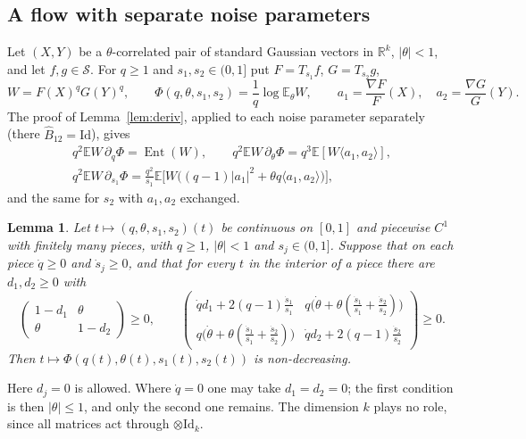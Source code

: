 \documentclass[11pt]{amsart}
\newtheorem{lemma}[theorem]{Lemma}
\theoremstyle{definition}
\newcommand{\E}{\mathbb{E}}
\newcommand{\R}{\mathbb{R}}
\newcommand{\Ent}{\operatorname{Ent}}
\newcommand{\cS}{\mathcal{S}}
\newcommand{\Id}{\mathrm{Id}}
\begin{document}
\subsection{A flow with separate noise parameters}\label{sec:noiseflow}
Let $(X,Y)$ be a $\theta$-correlated pair of standard Gaussian vectors in $\R^k$, $|\theta|<1$, and let $f,g\in\cS$. For
$q\ge1$ and $s_1,s_2\in(0,1]$ put $F=T_{s_1}f$, $G=T_{s_2}g$,
\[
W=F(X)^qG(Y)^q,\qquad\Phi(q,\theta,s_1,s_2)=\frac1q\log\E_\theta W,\qquad a_1=\frac{\nabla F}{F}(X),\quad
a_2=\frac{\nabla G}{G}(Y).
\]
The proof of Lemma~\ref{lem:deriv}, applied to each noise parameter separately (there $\widehat B_{12}=\Id$), gives
\begin{gather*}
q^2\E W\,\partial_q\Phi=\Ent(W),\qquad q^2\E W\,\partial_\theta\Phi=q^3\E[W\langle a_1,a_2\rangle],\\
q^2\E W\,\partial_{s_1}\Phi=\frac{q^2}{s_1}\E\big[W\big((q-1)|a_1|^2+\theta q\langle a_1,a_2\rangle\big)\big],
\end{gather*}
and the same for $s_2$ with $a_1,a_2$ exchanged.

\begin{lemma}\label{lem:noise}
Let $t\mapsto(q,\theta,s_1,s_2)(t)$ be continuous on $[0,1]$ and piecewise $C^1$ with finitely many pieces, with $q\ge1$, $|\theta|<1$ and
$s_j\in(0,1]$. Suppose that on each piece $\dot q\ge0$ and $\dot s_j\ge0$, and that for every $t$ in the interior of
a piece there are $d_1,d_2\ge0$ with
\begin{equation}\label{eq:noiseLMI}
\begin{pmatrix}1-d_1&\theta\\\theta&1-d_2\end{pmatrix}\ge0,\qquad
\begin{pmatrix}\dot qd_1+2(q-1)\frac{\dot s_1}{s_1}&q\big(\dot\theta+\theta(\frac{\dot s_1}{s_1}+\frac{\dot s_2}{s_2})\big)\\
q\big(\dot\theta+\theta(\frac{\dot s_1}{s_1}+\frac{\dot s_2}{s_2})\big)&\dot qd_2+2(q-1)\frac{\dot s_2}{s_2}\end{pmatrix}\ge0 .
\end{equation}
Then $t\mapsto\Phi(q(t),\theta(t),s_1(t),s_2(t))$ is non-decreasing.
\end{lemma}

Here $d_j=0$ is allowed. Where $\dot q=0$ one may take $d_1=d_2=0$; the first condition is then $|\theta|\le1$, and only
the second one remains. The dimension $k$ plays no role, since all matrices act through $\otimes\Id_k$.
\end{document}
